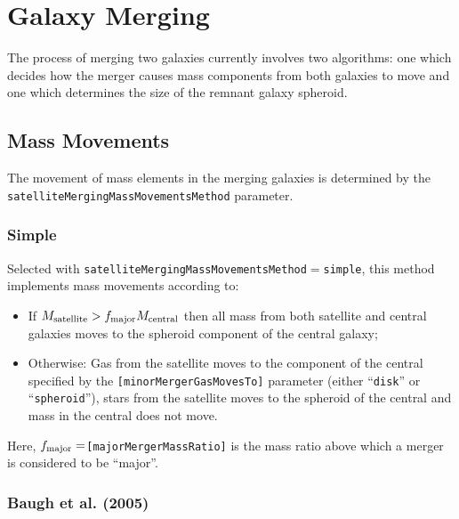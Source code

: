 \section{Galaxy Merging}

The process of merging two galaxies currently involves two algorithms: one which decides how the merger causes mass components from both galaxies to move and one which determines the size of the remnant galaxy spheroid.

\subsection{Mass Movements}\label{sec:MergingMassMovements}

The movement of mass elements in the merging galaxies is determined by the {\tt satelliteMergingMassMovementsMethod} parameter. 

\subsubsection{Simple}

Selected with {\tt satelliteMergingMassMovementsMethod}$=${\tt simple}, this method implements mass movements according to:
\begin{itemize}
 \item If $M_{\rm satellite} > f_{\rm major} M_{\rm central}$ then all mass from both satellite and central galaxies moves to the spheroid \gls{component} of the central galaxy;
 \item Otherwise: Gas from the satellite moves to the \gls{component} of the central specified by the {\tt [minorMergerGasMovesTo]} parameter (either ``{\tt disk}'' or ``{\tt spheroid}''), stars from the satellite moves to the spheroid of the central and mass in the central does not move.
\end{itemize}
Here, $f_{\rm major}=${\tt [majorMergerMassRatio]} is the mass ratio above which a merger is considered to be ``major''.

\subsubsection{Baugh et al. (2005)}

